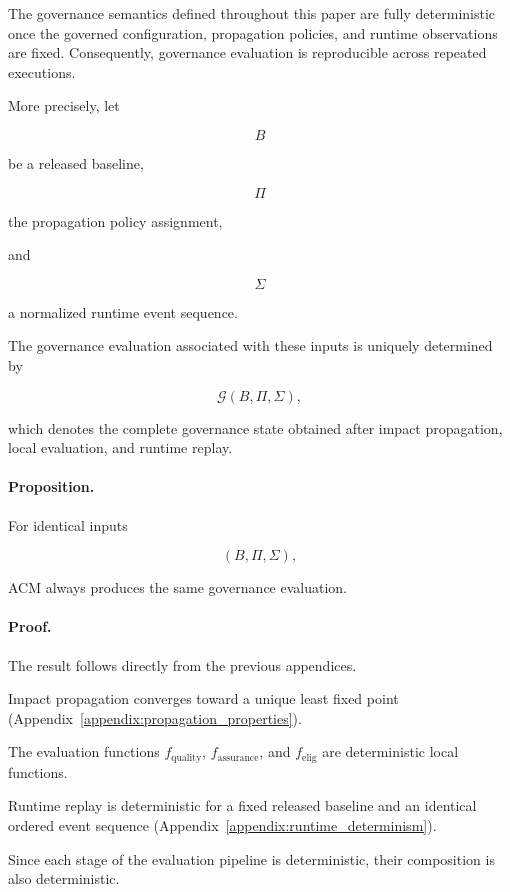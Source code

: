 \documentclass[10pt]{article}
\begin{document}
	The governance semantics defined throughout this paper are fully deterministic
	once the governed configuration, propagation policies, and runtime observations
	are fixed. Consequently, governance evaluation is reproducible across repeated
	executions.
	
	More precisely, let
	
	\[
	B
	\]
	
	be a released baseline,
	
	\[
	\Pi
	\]
	
	the propagation policy assignment,
	
	and
	
	\[
	\Sigma
	\]
	
	a normalized runtime event sequence.
	
	The governance evaluation associated with these inputs is uniquely determined by
	
	\[
	\mathcal G(B,\Pi,\Sigma),
	\]
	
	which denotes the complete governance state obtained after impact propagation,
	local evaluation, and runtime replay.
	
	\paragraph*{Proposition.}
	
	For identical inputs
	
	\[
	(B,\Pi,\Sigma),
	\]
	
	ACM always produces the same governance evaluation.
	
	\paragraph*{Proof.}
	
	The result follows directly from the previous appendices.
	
	Impact propagation converges toward a unique least fixed point
	(Appendix~\ref{appendix:propagation_properties}).
	
	The evaluation functions
	$f_{\mathrm{quality}}$,
	$f_{\mathrm{assurance}}$,
	and
	$f_{\mathrm{elig}}$
	are deterministic local functions.
	
	Runtime replay is deterministic for a fixed released baseline and an identical
	ordered event sequence
	(Appendix~\ref{appendix:runtime_determinism}).
	
	Since each stage of the evaluation pipeline is deterministic, their composition
	is also deterministic.
	
\end{document}
